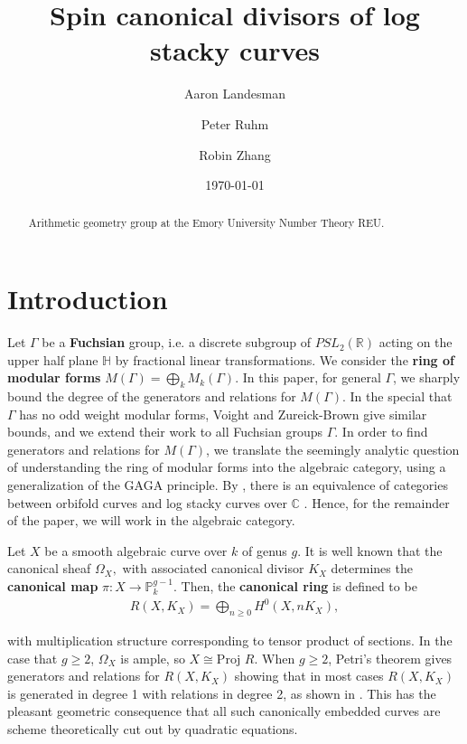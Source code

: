 \documentclass{amsart}
\title{Spin canonical divisors of log stacky curves}
\author{Aaron Landesman}
\author{Peter Ruhm}
\author{Robin Zhang}
\date{\today}
\theoremstyle{plain}
\theoremstyle{definition}
\theoremstyle{remark}
\numberwithin{equation}{section}
\newcommand\bh{{\mathbb H}}
\newcommand\BC{{\mathbb C}}
\newcommand\BR{{\mathbb R}}
\newcommand\BP{{\mathbb P}}
\newcommand \proj{\text{Proj }}
\begin{document}
\begin{abstract}
  Arithmetic geometry group at the Emory University Number Theory
	REU.
\end{abstract}

\maketitle

\tableofcontents



\section{Introduction}
Let $\Gamma$ be a {\bf Fuchsian} group, i.e. a discrete subgroup
of $PSL_2(\BR)$ acting on the upper half plane $\bh$ by fractional
linear transformations. We consider the {\bf ring of modular forms}
$M(\Gamma) = \bigoplus_k M_k(\Gamma)$. In this paper, for general
$\Gamma$, we sharply bound the degree of the generators and
relations for $M(\Gamma).$ In the special that $\Gamma$ has no odd weight modular forms, Voight and Zureick-Brown
\cite[Chapters 7-9]{vzb:stacky} give similar bounds, and we extend their work to all Fuchsian groups $\Gamma$. In order to find generators and relations for $M(\Gamma)$, we translate the seemingly analytic question of understanding the ring of modular forms into the algebraic
category, using a generalization of the GAGA principle. By
\cite[Proposition 6.1.5]{vzb:stacky}, there is an equivalence of
categories between orbifold curves and log stacky curves over $\BC$
. Hence, for the remainder of the paper, we will work in the
algebraic category.

Let $X$ be a smooth algebraic curve over $k$ of genus $g$. It is
well known that the canonical sheaf $\Omega _X,$ with associated canonical divisor $K_X$
 determines the {\bf canonical map } $\pi:X \rightarrow \BP_k^{g - 1}$.
Then, the {\bf canonical ring} is defined to be
\begin{align*}
	R(X,K_X) = \bigoplus_{n \geq 0} H^0(X,nK_X),
\end{align*}

\noindent
with multiplication structure corresponding to tensor product of
sections. In the case that $g \geq 2$, $\Omega_X$ is ample, so $X \cong \proj R$. When $g \geq 2$, Petri's
theorem gives generators and relations for $R(X, K_X)$ showing that
in most cases $R(X, K_X)$ is generated in degree 1 with relations
in degree 2, as shown in \cite[p. 157]{saint-donat:proj}. This has the
pleasant geometric consequence that all such canonically embedded
curves are scheme theoretically cut out by quadratic equations.
\end{document}
